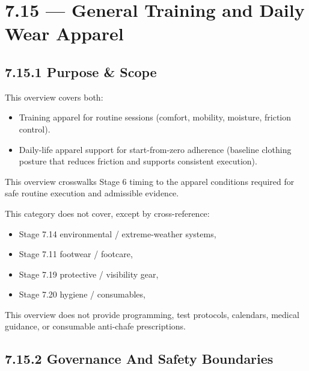 \documentclass[10pt]{article}
\begin{document}
\section*{7.15 — General Training and Daily Wear Apparel}
{}

\subsection*{7.15.1 Purpose \& Scope}
{}

This overview covers both:

\begin{itemize}
\item Training apparel for routine sessions (comfort, mobility, moisture, friction control).
\item Daily-life apparel support for start-from-zero adherence (baseline clothing posture that reduces friction and supports consistent execution).
\end{itemize}

This overview crosswalks Stage 6 timing to the apparel conditions required for safe routine execution and admissible evidence.

This category does not cover, except by cross-reference:

\begin{itemize}
\item Stage 7.14 environmental / extreme-weather systems,
\item Stage 7.11 footwear / footcare,
\item Stage 7.19 protective / visibility gear,
\item Stage 7.20 hygiene / consumables,
\end{itemize}

This overview does not provide programming, test protocols, calendars, medical guidance, or consumable anti-chafe prescriptions.

\subsection*{7.15.2 Governance And Safety Boundaries}
{}
\end{document}
